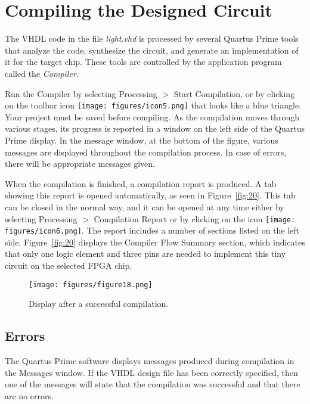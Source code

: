 \section{Compiling the Designed Circuit}


The VHDL code in the file {\it light.vhd} is processed by several 
Quartus Prime tools that analyze the code, synthesize the circuit,
and generate an implementation of it for the target chip. 
These tools are controlled by the application program called the {\it Compiler}.

Run the Compiler by selecting {\sf Processing $>$ Start Compilation}, or by 
clicking on the toolbar icon \texttt{[image: figures/icon5.png]} that looks like a
blue triangle. Your project must be saved before compiling. 
As the compilation moves through various stages, its progress is reported
in a window on the left side of the Quartus Prime display.
In the message window, at the bottom of the figure, various messages are displayed
throughout the compilation process.
In case of errors, there will be appropriate messages given.

When the compilation is finished, a compilation report is produced.
A tab showing this report is opened automatically, as seen in Figure~\ref{fig:20}.
This tab can be closed in the normal way, and it can be opened at any time
either by selecting {\sf Processing $>$ Compilation Report} or by clicking on 
the icon \texttt{[image: figures/icon6.png]}.
The report includes a number of sections listed on the left side.
Figure~\ref{fig:20} displays the Compiler Flow Summary section, which
indicates that only one logic element and three pins are needed to implement this 
tiny circuit on the selected FPGA chip.

\begin{figure}[H]
   \begin{center}
      \texttt{[image: figures/figure18.png]}
   \caption{Display after a successful compilation.} 
	 \label{fig:18}
	 \end{center}
\end{figure}

\subsection{Errors}

The Quartus Prime software displays messages produced during compilation in the Messages window.
If the VHDL design file has been correctly specified, then one of the messages will
state that the compilation was successful and that there are no errors.

